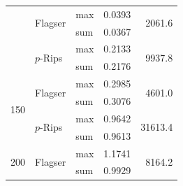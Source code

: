 \documentclass[a4paper,11pt]{article}
\theoremstyle{remark}
\begin{document}
\begin{appendices}
\begin{table}[ht]
\begin{tabular}{r l l r r}
 & \multirow{2}{*}{Flagser} & max & 0.0393 & \multirow{2}{*}{2061.6} \\
 &                           & sum & 0.0367 &                         \\
 
 & \multirow{2}{*}{$p$-Rips} & max & 0.2133 & \multirow{2}{*}{9937.8} \\
 &                           & sum & 0.2176 &                         \\
\midrule
\multirow{4}{*}{150}


 & \multirow{2}{*}{Flagser} & max & 0.2985 & \multirow{2}{*}{4601.0} \\
 &                           & sum & 0.3076 &                         \\
 
 & \multirow{2}{*}{$p$-Rips} & max & 0.9642 & \multirow{2}{*}{31613.4} \\
 &                           & sum & 0.9613 &                         \\
\midrule
\multirow{4}{*}{200}
 
 & \multirow{2}{*}{Flagser} & max & 1.1741 & \multirow{2}{*}{8164.2} \\
 &                           & sum & 0.9929 &                         \\
 


\end{tabular}
\end{table}
\end{appendices}
\end{document}
